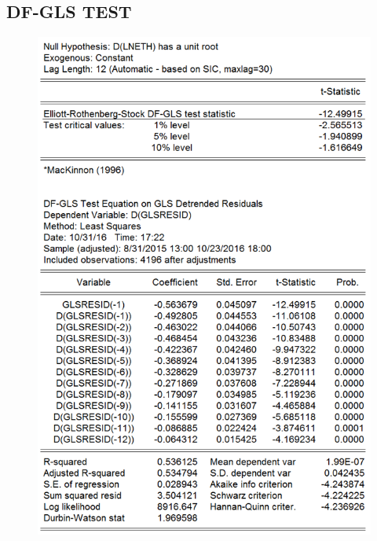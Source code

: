 \documentclass[11pt]{report}
\begin{document}
\subsection*{DF-GLS TEST}
\begin{figure}[!h]
\begin{minipage}[c]{.46\linewidth}
\includegraphics[scale=0.5]{Appendix/chap2/1}
\end{minipage} \hfill
\begin{minipage}[c]{.46\linewidth}

\end{minipage}
\end{figure}
\end{document}
